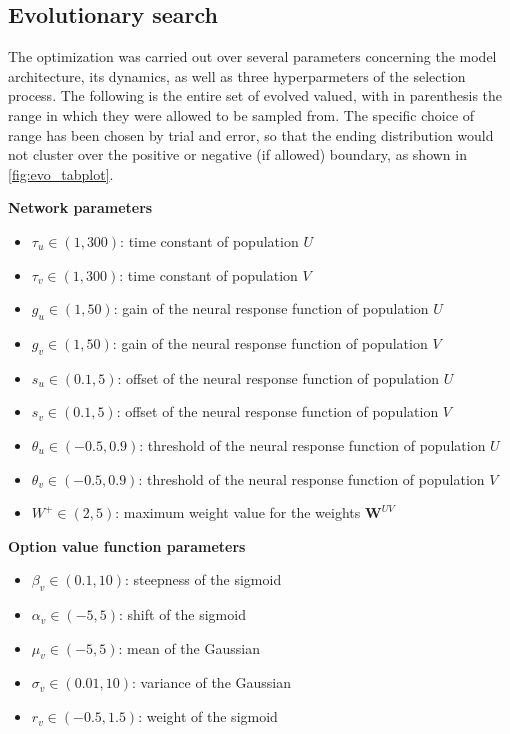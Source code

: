 
\subsection{Evolutionary search} \label{list:params}
The optimization was carried out over several parameters concerning the model architecture, its dynamics, as well as three hyperparmeters of the selection process.
The following is the entire set of evolved valued, with in parenthesis the range in which they were allowed to be sampled from.
The specific choice of range has been chosen by trial and error, so that the ending distribution would not cluster over the positive or negative (if allowed) boundary, as shown in \ref{fig:evo_tabplot}.

\hfill \break
\noindent \textbf{Network parameters}
\begin{itemize}
    \item $\tau_{u}\in (1, 300)$: time constant of population $U$
    \item $\tau_{v}\in (1, 300)$: time constant of population $V$
    \item $g_{u}\in (1, 50)$: gain of the neural response function of population $U$
    \item $g_{v}\in (1, 50)$: gain of the neural response function of population $V$
    \item $s_{u}\in (0.1, 5)$: offset of the neural response function of population $U$
    \item $s_{v}\in (0.1, 5)$: offset of the neural response function of population $V$
    \item $\theta_{u}\in (-0.5, 0.9)$: threshold of the neural response function of population $U$
    \item $\theta_{v}\in (-0.5, 0.9)$: threshold of the neural response function of population $V$
    \item $W^{+}\in (2, 5)$: maximum weight value for the weights $\textbf{W}^{UV}$
\end{itemize}

\noindent \textbf{Option value function parameters}
\begin{itemize}
    \item $\beta_{v}\in (0.1, 10)$: steepness of the sigmoid
    \item $\alpha_{v}\in (-5, 5)$: shift of the sigmoid
    \item $\mu_{v}\in (-5, 5)$: mean of the Gaussian
    \item $\sigma_{v}\in (0.01, 10)$: variance of the Gaussian
    \item $r_{v}\in (-0.5, 1.5)$: weight of the sigmoid
\end{itemize}

